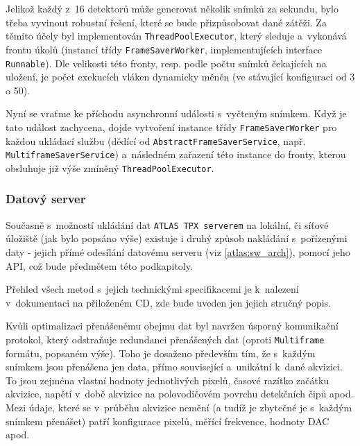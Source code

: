 Jelikož každý z~16 detektorů může generovat několik snímků za sekundu, bylo třeba vyvinout robustní řešení, které se bude přizpůsobovat dané zátěži. Za těmito účely byl implementován \texttt{ThreadPoolExecutor}, který sleduje a~vykonává frontu úkolů (instancí třídy \texttt{FrameSaverWorker}, implementujících interface \texttt{Runnable}). Dle velikosti této fronty, resp. podle počtu snímků čekajících na uložení, je počet exekucích vláken dynamicky měněn (ve stávající konfiguraci od 3 o 50). 

Nyní se vraťme ke příchodu asynchronní události s~vyčteným snímkem. Když je tato událost zachycena, dojde vytvoření instance třídy \texttt{FrameSaverWorker} pro každou ukládací službu (dědící od \texttt{AbstractFrameSaverService}, např. \texttt{MultiframeSaverService}) a~následném zařazení této instance do fronty, kterou obsluhuje již výše zmíněný \texttt{ThreadPoolExecutor}.


\subsubsection{Datový server}\label{atlas:cont:output:dataserver}
Současně s~možností ukládání dat \texttt{ATLAS TPX serverem} na lokální, či síťové úložiště (jak bylo popsáno výše) existuje i druhý způsob nakládání s~pořízenými daty - jejich přímé odesílání datovému serveru (viz \ref{atlas:sw_arch}), pomocí jeho API, což bude předmětem této podkapitoly.

Přehled všech metod s~jejich technickými specifikacemi je k~nalezení v~dokumentaci na přiloženém CD, zde bude uveden jen jejich stručný popis.

Kvůli optimalizaci přenášenému obejmu dat byl navržen úsporný komunikační protokol, který odstraňuje redundanci přenášených dat (oproti \texttt{Multiframe} formátu, popsaném výše). Toho je dosaženo především tím, že s~každým snímkem jsou přenášena jen data, přímo související a~unikátní k~dané akvizici. To jsou zejména vlastní hodnoty jednotlivých pixelů, časové razítko začátku akvizice, napětí v~době akvizice na polovodičovém povrchu detekčních čipů apod. Mezi údaje, které se v~průběhu akvizice nemění (a tudíž je zbytečné je s~každým snímkem přenášet) patří konfigurace pixelů, měřící frekvence, hodnoty DAC apod.

